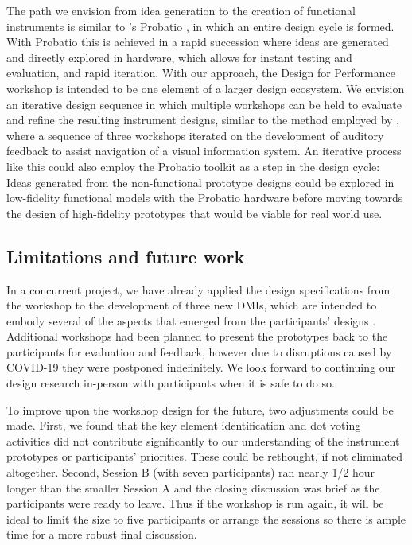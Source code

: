 \documentclass[letterpaper, 12pt]{article}
\begin{document}
The path we envision from idea generation to the creation of functional instruments is similar to \citeauthor{Calegario2017}'s Probatio \citeyearpar{Calegario2017}, in which an entire design cycle is formed. With Probatio this is achieved in a rapid succession where ideas are generated and directly explored in hardware, which allows for instant testing and evaluation, and rapid iteration. 
With our approach, the Design for Performance workshop is intended to be one element of a larger design ecosystem. We envision an iterative design sequence in which multiple workshops can be held to evaluate and refine the resulting instrument designs, similar to the method employed by \citet{Absar2015}, where a sequence of three workshops iterated on the development of auditory feedback to assist navigation of a visual information system. An iterative process like this could also employ the Probatio toolkit as a step in the design cycle: Ideas generated from the non-functional prototype designs could be explored in low-fidelity functional models with the Probatio hardware before moving towards the design of high-fidelity prototypes that would be viable for real world use.

\subsection{Limitations and future work}
\label{sec:limitations-and-future-work}

In a concurrent project, we have already applied the design specifications from the workshop to the development of three new DMIs, which are intended to embody several of the aspects that emerged from the participants' designs \citep{Sullivan2020nime}. Additional workshops had been planned to present the prototypes back to the participants for evaluation and feedback, however due to disruptions caused by COVID-19 they were postponed indefinitely. We look forward to continuing our design research in-person with participants when it is safe to do so.

To improve upon the workshop design for the future, two adjustments could be made. First, we found that the key element identification and dot voting activities did not contribute significantly to our understanding of the instrument prototypes or participants' priorities. These could be rethought, if not eliminated altogether. Second, Session B (with seven participants) ran nearly 1/2 hour longer than the smaller Session A and the closing discussion was brief as the participants were ready to leave. Thus if the workshop is run again, it will be ideal to limit the size to five participants or arrange the sessions so there is ample time for a more robust final discussion. 
\end{document}
